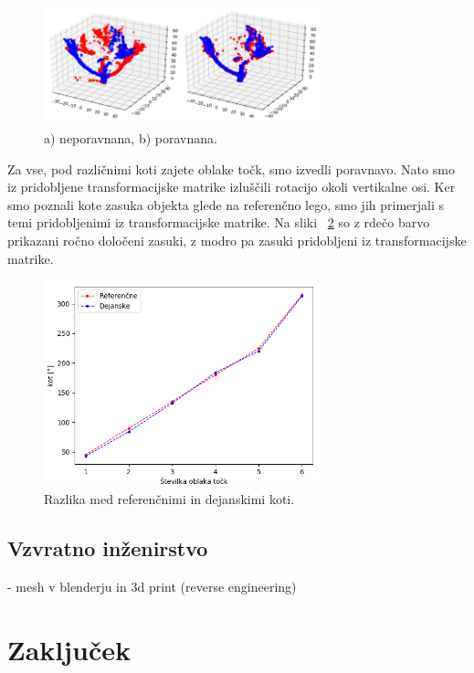 \documentclass[journal,a4paper,twoside]{sty/IEEEtran}
\begin{document}
\begin{figure}[H]
	\centerline{\includegraphics[width=8cm]{fig/poravnava}}
	\caption{a) neporavnana, b) poravnana.}
	\label{fig:poravnava}
\end{figure}
%
Za vse, pod različnimi koti zajete oblake točk, smo izvedli poravnavo. Nato smo iz pridobljene transformacijske matrike izluščili rotacijo okoli vertikalne osi. Ker smo poznali kote zasuka objekta glede na referenčno lego, smo jih primerjali s temi pridobljenimi iz transformacijske matrike. Na sliki ~\ref{fig:poravnava_graf} so z rdečo barvo prikazani ročno določeni zasuki, z modro pa zasuki pridobljeni iz transformacijske matrike.

\begin{figure}[H]
	\centerline{\includegraphics[width=8cm]{fig/graf_poravnave}}
	\caption{Razlika med referenčnimi in dejanskimi koti.}
	\label{fig:poravnava_graf}
\end{figure}

\subsection{Vzvratno inženirstvo}
-  mesh v blenderju in 3d print (reverse engineering)






\section{Zaključek}
\end{document}
